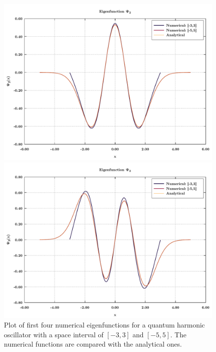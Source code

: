 \documentclass[rmp,10pt,onecolumn,fleqn,notitlepage]{revtex4-1}
\begin{document}
\begin{figure}[h!]
\begin{minipage}[c]{0.48\linewidth}
\includegraphics[width=1\textwidth]{image/eig_func_3.pdf}
\end{minipage}
\begin{minipage}[]{0.48\linewidth}
\centering
\includegraphics[width=1\textwidth]{image/eig_func_4.pdf}
\end{minipage}
\caption{\label{fig:result_eigenfunc} Plot of first four numerical eigenfunctions for a quantum harmonic oscillator with a space interval of \( [-3,3] \) and \( [-5,5] \). The numerical functions are compared with the analytical ones.}
\end{figure}
\end{document}
